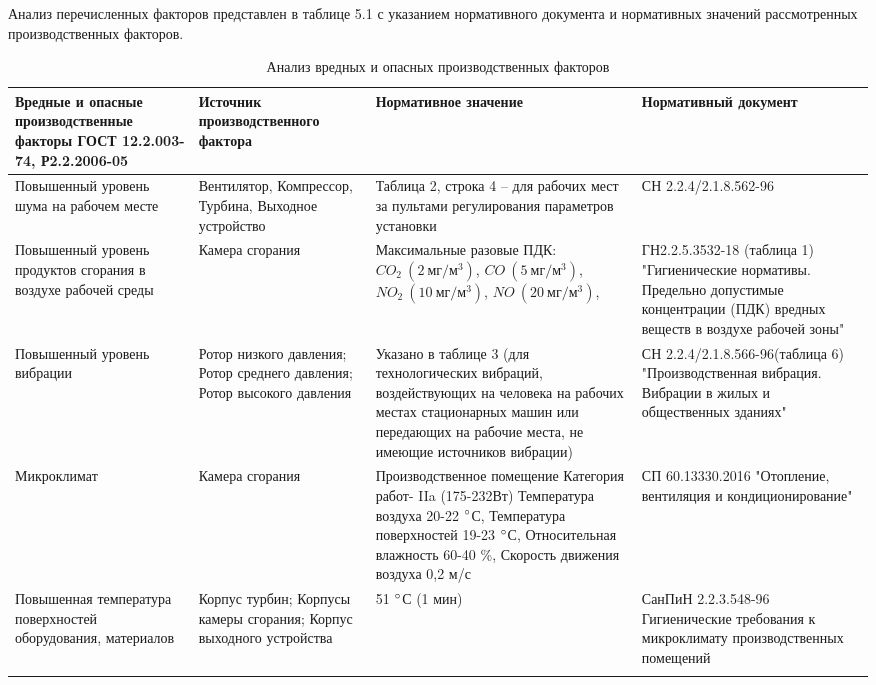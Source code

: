 Анализ перечисленных факторов представлен в таблице 5.1 с указанием нормативного документа и нормативных значений рассмотренных производственных факторов.

\begin{longtable}{|p{4cm}|p{3cm}|p{5cm}|p{4cm}|}
	\hline
	\textbf{Вредные и опасные производственные факторы ГОСТ 12.2.003-74, Р2.2.2006-05} & 
	\textbf{Источник производственного фактора} &
	\textbf{Нормативное значение} &
	\textbf{Нормативный документ} \\ \hline
	\endhead
	
	Повышенный уровень шума на рабочем месте & 
	Вентилятор, Компрессор, Турбина, Выходное устройство &
	Таблица 2, строка 4 – для рабочих мест за пультами регулирования параметров установки &
	СН 2.2.4/2.1.8.562-96 \\ \hline

	Повышенный уровень продуктов сгорания в воздухе рабочей среды &
	Камера сгорания & 
	Максимальные разовые ПДК: $CO_2 \ (2 \ мг/м^3)$, $CO \ (5 \ мг/м^3)$, $NO_2 \ (10 \ мг/м^3)$, $NO \ (20 \ мг/м^3)$,  &
	ГН2.2.5.3532-18 (таблица 1) "Гигиенические нормативы. Предельно допустимые концентрации (ПДК) вредных веществ в воздухе рабочей зоны" \\ \hline

	Повышенный уровень вибрации & 
	Ротор низкого давления; Ротор среднего давления; Ротор высокого давления &
	Указано в таблице 3 (для технологических вибраций, воздействующих на человека на рабочих местах стационарных машин или передающих на рабочие места, не имеющие источников вибрации) &
	СН 2.2.4/2.1.8.566-96(таблица 6) "Производственная вибрация. Вибрации в жилых и общественных зданиях" \\ \hline

	Микроклимат & 
	Камера сгорания &
	Производственное помещение Категория работ- IIa (175-232Вт) Температура воздуха 20-22 $\degree$С, Температура поверхностей 19-23 $\degree$С, Относительная влажность 60-40 \%, Скорость движения воздуха 0,2 м/с &
	СП 60.13330.2016 "Отопление, вентиляция и кондиционирование" \\ \hline

	Повышенная температура поверхностей оборудования, материалов &
	Корпус турбин; Корпусы камеры сгорания; Корпус выходного устройства &
	51 $\degree$С (1 мин) &
	СанПиН 2.2.3.548-96 Гигиенические требования к микроклимату производственных помещений \\ \hline

	\caption{Анализ вредных и опасных производственных факторов} \label{tab:ecology-factor-analisys}
\end{longtable}


